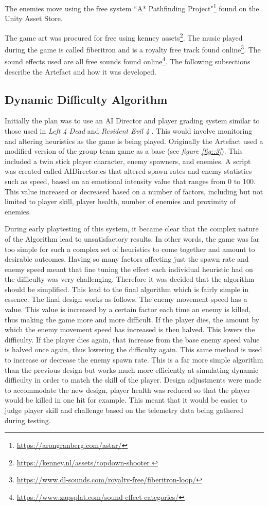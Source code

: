 \documentclass[journal]{IEEEtran}
\begin{document}
The enemies move using the free system ``A* Pathfinding Project"\footnote{\url{https://arongranberg.com/astar/}} found on the Unity Asset Store.

The game art was procured for free using kenney assets\footnote{\url{https://kenney.nl/assets/topdown-shooter }}. The music played during the game is called fiberitron and is a royalty free track found online\footnote{\url{https://www.dl-sounds.com/royalty-free/fiberitron-loop/}}. The sound effects used are all free sounds found online\footnote{\url{https://www.zapsplat.com/sound-effect-categories/}}. The following subsections describe the Artefact and how it was developed.


\subsection{Dynamic Difficulty Algorithm}


Initially the plan was to use an AI Director and player grading system similar to those used in \textit{Left 4 Dead} \cite{game:left4dead} and \textit{Resident Evil 4} \cite{game:re4}. This would involve monitoring and altering heuristics as the game is being played. Originally the Artefact used a modified version of the group team game as a base (see \textit{figure \ref{fig::3}}). This included a twin stick player character, enemy spawners, and enemies. A script was created called AIDirector.cs that altered spawn rates and enemy statistics such as speed, based on an emotional intensity value that ranges from 0 to 100. This value increased or decreased based on a number of factors, including but not limited to player skill, player health, number of enemies and proximity of enemies. 

During early playtesting of this system, it became clear that the complex nature of the Algorithm lead to unsatisfactory results. In other words, the game was far too simple for such a complex set of heuristics to come together and amount to desirable outcomes. Having so many factors affecting just the spawn rate and enemy speed meant that fine tuning the effect each individual heuristic had on the difficulty was very challenging. Therefore it was decided that the algorithm should be simplified. This lead to the final algorithm which is fairly simple in essence. The final design works as follows. The enemy movement speed has a value. This value is increased by a certain factor each time an enemy is killed, thus making the game more and more difficult. If the player dies, the amount by which the enemy movement speed has increased is then halved. This lowers the difficulty. If the player dies again, that increase from the base enemy speed value is halved once again, thus lowering the difficulty again. This same method is used to increase or decrease the enemy spawn rate. This is a far more simple algorithm than the previous design but works much more efficiently at simulating dynamic difficulty in order to match the skill of the player. Design adjustments were made to accommodate the new design, player health was reduced so that the player would be killed in one hit for example. This meant that it would be easier to judge player skill and challenge based on the telemetry data being gathered during testing.
\end{document}
